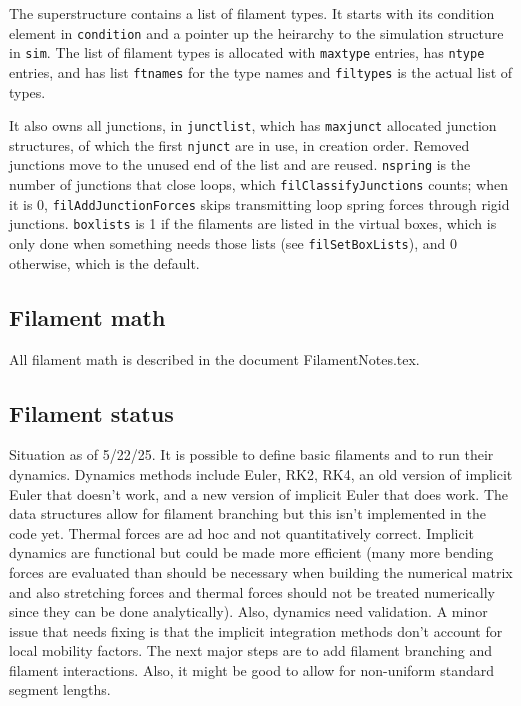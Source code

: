 \documentclass {scrbook}
\newcommand {\ttt} {\texttt}
\begin{document}
The superstructure contains a list of filament types. It starts with its condition element in \ttt{condition} and a pointer up the heirarchy to the simulation structure in \ttt{sim}. The list of filament types is allocated with \ttt{maxtype} entries, has \ttt{ntype} entries, and has list \ttt{ftnames} for the type names and \ttt{filtypes} is the actual list of types.

It also owns all junctions, in \ttt{junctlist}, which has \ttt{maxjunct} allocated junction structures, of which the first \ttt{njunct} are in use, in creation order. Removed junctions move to the unused end of the list and are reused. \ttt{nspring} is the number of junctions that close loops, which \ttt{filClassifyJunctions} counts; when it is 0, \ttt{filAddJunctionForces} skips transmitting loop spring forces through rigid junctions. \ttt{boxlists} is 1 if the filaments are listed in the virtual boxes, which is only done when something needs those lists (see \ttt{filSetBoxLists}), and 0 otherwise, which is the default.

\subsection{Filament math}

All filament math is described in the document FilamentNotes.tex.

\subsection{Filament status}

Situation as of 5/22/25. It is possible to define basic filaments and to run their dynamics. Dynamics methods include Euler, RK2, RK4, an old version of implicit Euler that doesn't work, and a new version of implicit Euler that does work. The data structures allow for filament branching but this isn't implemented in the code yet. Thermal forces are ad hoc and not quantitatively correct. Implicit dynamics are functional but could be made more efficient (many more bending forces are evaluated than should be necessary when building the numerical matrix and also stretching forces and thermal forces should not be treated numerically since they can be done analytically). Also, dynamics need validation. A minor issue that needs fixing is that the implicit integration methods don't account for local mobility factors. The next major steps are to add filament branching and filament interactions. Also, it might be good to allow for non-uniform standard segment lengths.
\end{document}
